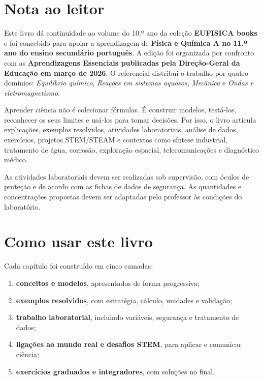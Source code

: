\documentclass[11pt,a4paper,oneside]{book}
\begin{document}
\chapter*{Nota ao leitor}
Este livro dá continuidade ao volume do 10.º ano da coleção \textbf{EUFISICA books} e foi concebido para apoiar a aprendizagem de \textbf{Física e Química A no 11.º ano do ensino secundário português}. A edição foi organizada por confronto com as \textbf{Aprendizagens Essenciais publicadas pela Direção-Geral da Educação em março de 2026}. O referencial distribui o trabalho por quatro domínios: \textit{Equilíbrio químico}, \textit{Reações em sistemas aquosos}, \textit{Mecânica} e \textit{Ondas e eletromagnetismo}.

Aprender ciência não é colecionar fórmulas. É construir modelos, testá-los, reconhecer os seus limites e usá-los para tomar decisões. Por isso, o livro articula explicações, exemplos resolvidos, atividades laboratoriais, análise de dados, exercícios, projetos STEM/STEAM e contextos como síntese industrial, tratamento de água, corrosão, exploração espacial, telecomunicações e diagnóstico médico.

\begin{nota}
As atividades laboratoriais devem ser realizadas sob supervisão, com óculos de proteção e de acordo com as fichas de dados de segurança. As quantidades e concentrações propostas devem ser adaptadas pelo professor às condições do laboratório.
\end{nota}

\chapter*{Como usar este livro}
Cada capítulo foi construído em cinco camadas:
\begin{enumerate}
  \item \textbf{conceitos e modelos}, apresentados de forma progressiva;
  \item \textbf{exemplos resolvidos}, com estratégia, cálculo, unidades e validação;
  \item \textbf{trabalho laboratorial}, incluindo variáveis, segurança e tratamento de dados;
  \item \textbf{ligações ao mundo real e desafios STEM}, para aplicar e comunicar ciência;
  \item \textbf{exercícios graduados e integradores}, com soluções no final.
\end{enumerate}
\end{document}
